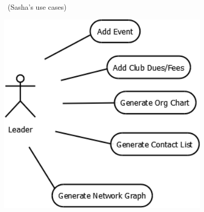 \documentclass[letterpaper]{article}
\newcommand\textstyleDefaultParagraphFont[1]{#1}
\begin{document}
\bigskip


\bigskip


\bigskip


\bigskip


\bigskip


\bigskip


\bigskip


\bigskip


\bigskip


\bigskip


\bigskip


\bigskip


\bigskip


\bigskip


\bigskip


\bigskip


\bigskip


\bigskip


\bigskip


\bigskip


\bigskip


\bigskip


\bigskip

{\color{black}
\textstyleDefaultParagraphFont{\ (Sasha{\textquoteright}s use cases)}}


\bigskip

 \includegraphics[width=3.9772in,height=3.8374in]{Gusspec-img3.png} 


\bigskip
\end{document}
